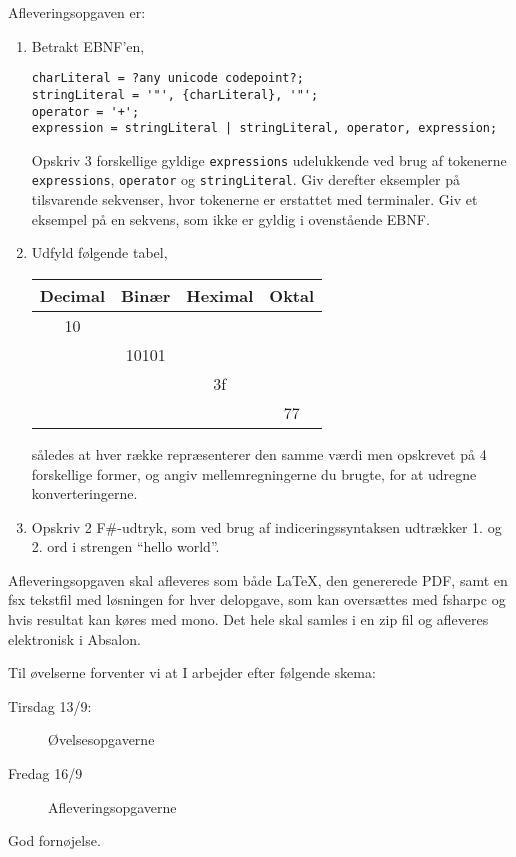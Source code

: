 \documentclass[a4paper,12pt]{article}
\begin{document}
Afleveringsopgaven er:
\begin{enumerate}[label=2i.\arabic*,start=0]
\item Betrakt EBNF'en,
\begin{lstlisting}[language=ebnf]
charLiteral = ?any unicode codepoint?;
stringLiteral = '"', {charLiteral}, '"';
operator = '+';
expression = stringLiteral | stringLiteral, operator, expression;
\end{lstlisting}
Opskriv 3 forskellige gyldige \lstinline[language=ebnf]{expressions} udelukkende ved brug af tokenerne \lstinline[language=ebnf]{expressions},  \lstinline[language=ebnf]{operator} og \lstinline[language=ebnf]{stringLiteral}. Giv derefter eksempler på tilsvarende sekvenser, hvor tokenerne er erstattet med terminaler. Giv et eksempel på en sekvens, som ikke er gyldig i ovenstående EBNF.
\item Udfyld følgende tabel,
  \begin{center}
    \begin{tabular}{|c|c|c|c|}
      \hline
      Decimal & Binær & Heximal & Oktal\\
      \hline
              10 &  &  & \\
      \hline
              & 10101 &  & \\
      \hline
               &  & 3f  & \\
      \hline
              &  &  & 77 \\
      \hline
    \end{tabular}
  \end{center}
således at hver række repræsenterer den samme værdi men opskrevet på 4 forskellige former, og angiv mellemregningerne du brugte, for at udregne konverteringerne.
\item Opskriv 2 F\#-udtryk, som ved brug af indiceringssyntaksen udtrækker 1. og 2. ord i strengen "`hello world"'.
\end{enumerate}
Afleveringsopgaven skal afleveres som både LaTeX, den genererede PDF, samt en fsx tekstfil med løsningen for hver delopgave, som kan oversættes med fsharpc og hvis resultat kan køres med mono. Det hele skal samles i en zip fil og afleveres elektronisk i Absalon.

Til øvelserne forventer vi at I arbejder efter følgende skema:
\begin{description}
\item[Tirsdag 13/9:] Øvelsesopgaverne
\item[Fredag 16/9]  Afleveringsopgaverne
\end{description}


\flushright God fornøjelse.
\end{document}
